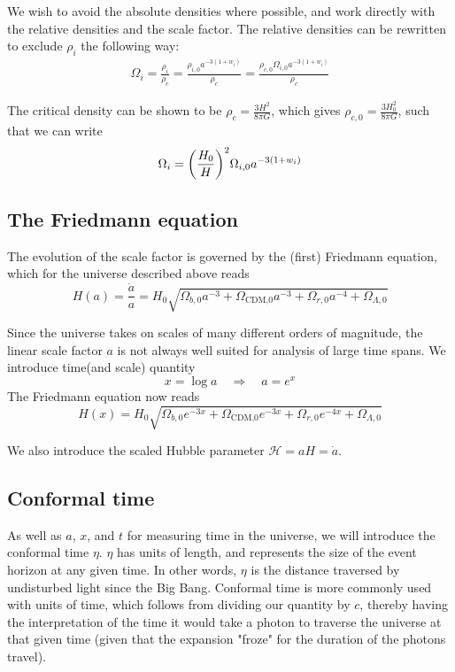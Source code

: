 \documentclass[10pt, a4paper]{article}
\renewcommand{\exp}{e^}
\renewcommand{\exp}{e^}
\begin{document}
We wish to avoid the absolute densities where possible, and work directly with the relative densities and the scale factor. The relative densities can be rewritten to exclude $\rho_i$ the following way:
\begin{align*}
    \Omega_{i} = \frac{\rho_i}{\rho_c} = \frac{\rho_{i,0}a^{-3(1+w_i)}}{\rho_c} = \frac{\rho_{c,0}\Omega_{i,0}a^{-3(1+w_i)}}{\rho_c}
\end{align*}

The critical density can be shown \cite{callin2006} to be $\rho_c = \frac{3H^2}{8\pi G}$, which gives $\rho_{c,0} = \frac{3H_0^2}{8\pi G}$, such that we can write
\begin{align}\label{eqn:Omegas}
    \Omega_{i} = \qty(\frac{H_0}{H})^2\Omega_{i,0}a^{-3(1+w_i)}
\end{align}


\subsection{The Friedmann equation}
The evolution of the scale factor is governed by the (first) Friedmann equation, which for the universe described above reads \cite{callin2006}
\begin{equation}
    H(a) = \frac{\dot{a}}{a} = H_0\sqrt{\Omega_{b,0} a^{-3} + \Omega_\text{{CDM},0}a^{-3} + \Omega_{r,0}a^{-4} + \Omega_{\Lambda,0}}
\end{equation}

Since the universe takes on scales of many different orders of magnitude, the linear scale factor $a$ is not always well suited for analysis of large time spans. We introduce time(and scale) quantity
\begin{equation}
    x = \log{a} \quad \Rightarrow \quad a = \exp{x}
\end{equation}
The Friedmann equation now reads
\begin{equation} \label{eqn:Friedmann}
    H(x) = H_0\sqrt{\Omega_{b,0} e^{-3x} + \Omega_\text{{CDM},0}e^{-3x} + \Omega_{r,0}e^{-4x} + \Omega_{\Lambda,0}}
\end{equation}

We also introduce the scaled Hubble parameter $\mathcal{H} = aH = \dot{a}$.


\subsection{Conformal time}
As well as $a$, $x$, and $t$ for measuring time in the universe, we will introduce the conformal time $\eta$. $\eta$ has units of length, and represents the size of the event horizon at any given time. In other words, $\eta$ is the distance traversed by undisturbed light since the Big Bang. Conformal time is more commonly used with units of time, which follows from dividing our quantity by $c$, thereby having the interpretation of the time it would take a photon to traverse the universe at that given time (given that the expansion "froze" for the duration of the photons travel).
\end{document}
